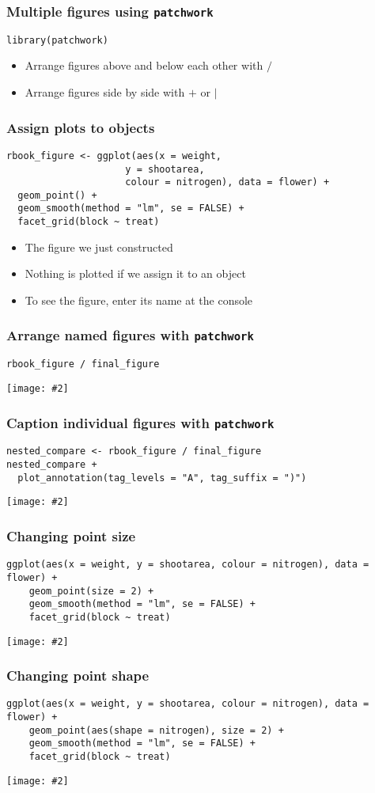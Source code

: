 \documentclass{beamer}
\newcommand{\bi}{\begin{itemize}}
\newcommand{\li}{\item}
\newcommand{\ei}{\end{itemize}}
\newcommand{\fig}[2]{\centerline{\texttt{[image: \#2]}}}
\newcommand{\bfr}[1]{\begin{frame}[fragile]\frametitle{{ #1 }}}
\begin{document}
\bfr{Multiple figures using {\tt patchwork}}

\begin{verbatim}
library(patchwork)
\end{verbatim}

\bi
\li Arrange figures  above and below each other with $/$
\li Arrange figures side by side with $+$ or $\vert$
\ei
\end{frame}

\bfr{Assign plots to objects}

\begin{verbatim}
rbook_figure <- ggplot(aes(x = weight, 
                     y = shootarea,
                     colour = nitrogen), data = flower) +
  geom_point() +
  geom_smooth(method = "lm", se = FALSE) +
  facet_grid(block ~ treat)
\end{verbatim}
\bi
\li The figure we just constructed
\li Nothing is plotted if we assign it to an object
\li To see the figure, enter its name at the console
\ei
\end{frame}

\bfr{Arrange named figures with {\tt patchwork}}
\begin{verbatim}
rbook_figure / final_figure
\end{verbatim}
\fig{.9}{side-by-side-patchwork-1.png}
\end{frame}

\bfr{Caption individual figures with {\tt patchwork}}
\scriptsize
\begin{verbatim}
nested_compare <- rbook_figure / final_figure
nested_compare +
  plot_annotation(tag_levels = "A", tag_suffix = ")")
\end{verbatim}
\fig{.9}{labelled-nested-1.png}
\end{frame}

\bfr{Changing point size}
\scriptsize
\begin{verbatim}
ggplot(aes(x = weight, y = shootarea, colour = nitrogen), data = flower) +
    geom_point(size = 2) +
    geom_smooth(method = "lm", se = FALSE) +
    facet_grid(block ~ treat)
\end{verbatim}
\fig{.8}{change-size-1.png}
\end{frame}


\bfr{Changing point shape}
\scriptsize
\begin{verbatim}
ggplot(aes(x = weight, y = shootarea, colour = nitrogen), data = flower) +
    geom_point(aes(shape = nitrogen), size = 2) +
    geom_smooth(method = "lm", se = FALSE) +
    facet_grid(block ~ treat)
\end{verbatim}
\fig{.8}{change-shape-1.png}
\end{frame}
\end{document}
